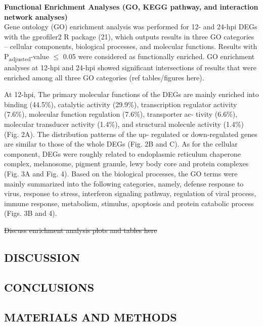 \documentclass[
]{article}
\begin{document}
\textbf{Functional Enrichment Analyses (GO, KEGG pathway, and
interaction network analyses)}\\
Gene ontology (GO) enrichment analysis was performed for 12- and 24-hpi
DEGs with the gprofiler2 R package (21), which outputs results in three
GO categories -- cellular components, biological processes, and
molecular functions. Results with P\textsubscript{adjusted}-value
\(\leq\) 0.05 were considered as functionally enriched. GO enrichment
analyses at 12-hpi and 24-hpi showed significant intersections of
results that were enriched among all three GO categories (ref
tables/figures here).

At 12-hpi, The primary molecular functions of the DEGs are mainly
enriched into binding (44.5\%), catalytic activity (29.9\%),
transcription regulator activity (7.6\%), molecular function regulation
(7.6\%), transporter ac- tivity (6.6\%), molecular transducer activity
(1.4\%), and structural molecule activity (1.4\%) (Fig. 2A). The
distribution patterns of the up- regulated or down-regulated genes are
similar to those of the whole DEGs (Fig. 2B and C). As for the cellular
component, DEGs were roughly related to endoplasmic reticulum chaperone
complex, melanosome, pigment granule, lewy body core and protein
complexes (Fig. 3A and Fig. 4). Based on the biological processes, the
GO terms were mainly summarized into the following categories, namely,
defense response to virus, response to stress, interferon signaling
pathway, regulation of viral process, immune response, metabolism,
stimulus, apoptosis and protein catabolic process (Figs. 3B and 4).

\st{Discuss enrichment analysis plots and tables here} \newpage

\subsection{DISCUSSION}\label{discussion}

\newpage

\subsection{CONCLUSIONS}\label{conclusions}

\newpage

\subsection{MATERIALS AND METHODS}\label{materials-and-methods}
\end{document}
